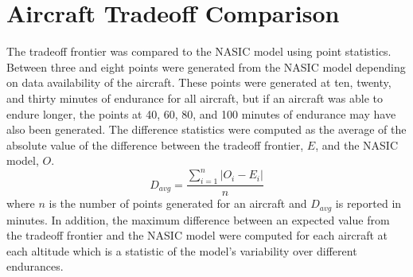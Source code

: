 \section{Aircraft Tradeoff Comparison}
The tradeoff frontier was compared to the NASIC model using point statistics. Between three and eight points were generated from the NASIC model depending on data availability of the aircraft. These points were generated at ten, twenty, and thirty minutes of endurance for all aircraft, but if an aircraft was able to endure longer, the points at 40, 60, 80, and 100 minutes of endurance may have also been generated. The difference statistics were computed as the average of the absolute value of the difference between the tradeoff frontier, $E$, and the NASIC model, $O$.
\begin{equation}
    D_{avg} = \dfrac{\sum_{i = 1}^n |O_i-E_i|}{n}
\end{equation}
where $n$ is the number of points generated for an aircraft and $D_{avg}$ is reported in minutes. In addition, the maximum difference between an expected value from the tradeoff frontier and the NASIC model were computed for each aircraft at each altitude which is a statistic of the model's variability over different endurances.
\begin{table}[H]
\caption{Difference Statistics Between NASIC Model and Tradeoff Model}
\label{tab:diffstatistics}
\end{table}
